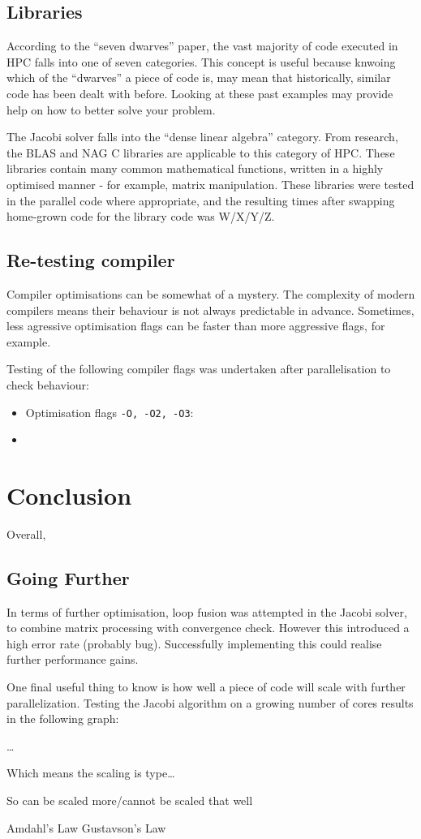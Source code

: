 \documentclass{article}
\begin{document}
\subsection{Libraries}
According to the ``seven dwarves'' paper, the vast
majority of code executed in HPC falls into one of seven
categories. This concept is useful because knwoing which of the
``dwarves'' a piece of code is, may mean that historically, similar
code has been dealt with before. Looking at these past examples may
provide help on how to better solve your problem.

The Jacobi solver falls into the ``dense linear algebra''
category. From research, the BLAS and NAG C libraries are applicable
to this category of HPC. These libraries contain many common mathematical
functions, written in a highly optimised manner - for example, matrix
manipulation. These libraries were tested in the parallel code where
appropriate, and the resulting times after swapping home-grown code
for the library code was W/X/Y/Z.

\subsection{Re-testing compiler}
Compiler optimisations can be somewhat of a mystery. The complexity of
modern compilers means their behaviour is not always predictable in
advance. Sometimes, less agressive optimisation flags can be faster
than more aggressive flags, for example.

Testing of the following compiler flags was undertaken after
parallelisation to check behaviour:

\begin{itemize}
\item Optimisation flags \texttt{-O, -O2, -O3}: 
\item 
\end{itemize}

\section{Conclusion}
Overall,

\subsection{Going Further}
In terms of further optimisation, loop fusion was attempted in the
Jacobi solver, to combine matrix processing with convergence
check. However this introduced a high error rate (probably
bug). Successfully implementing this could realise further performance
gains.

One final useful thing to know is how well a piece of code will scale
with further parallelization. Testing the Jacobi algorithm on a
growing number of cores results in the following graph:

\ldots

Which means the scaling is type\ldots

So can be scaled more/cannot be scaled that well

Amdahl's Law Gustavson's Law
\end{document}
